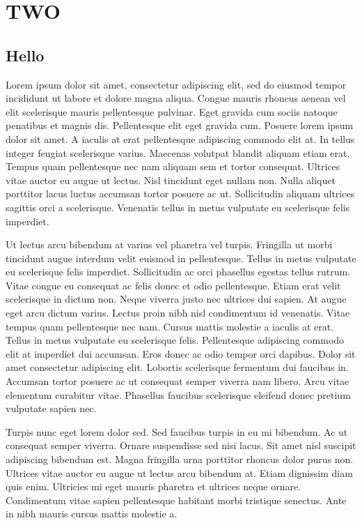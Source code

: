 \documentclass[../main.tex]{subfile}
\begin{document}
\chapter{TWO}
\section{Hello}
Lorem ipsum dolor sit amet, consectetur adipiscing elit, sed do eiusmod tempor incididunt ut labore et dolore magna aliqua. Congue mauris rhoncus aenean vel elit scelerisque mauris pellentesque pulvinar. Eget gravida cum sociis natoque penatibus et magnis dis. Pellentesque elit eget gravida cum. Posuere lorem ipsum dolor sit amet. A iaculis at erat pellentesque adipiscing commodo elit at. In tellus integer feugiat scelerisque varius. Maecenas volutpat blandit aliquam etiam erat. Tempus quam pellentesque nec nam aliquam sem et tortor consequat. Ultrices vitae auctor eu augue ut lectus. Nisl tincidunt eget nullam non. Nulla aliquet porttitor lacus luctus accumsan tortor posuere ac ut. Sollicitudin aliquam ultrices sagittis orci a scelerisque. Venenatis tellus in metus vulputate eu scelerisque felis imperdiet.

Ut lectus arcu bibendum at varius vel pharetra vel turpis. Fringilla ut morbi tincidunt augue interdum velit euismod in pellentesque. Tellus in metus vulputate eu scelerisque felis imperdiet. Sollicitudin ac orci phasellus egestas tellus rutrum. Vitae congue eu consequat ac felis donec et odio pellentesque. Etiam erat velit scelerisque in dictum non. Neque viverra justo nec ultrices dui sapien. At augue eget arcu dictum varius. Lectus proin nibh nisl condimentum id venenatis. Vitae tempus quam pellentesque nec nam. Cursus mattis molestie a iaculis at erat. Tellus in metus vulputate eu scelerisque felis. Pellentesque adipiscing commodo elit at imperdiet dui accumsan. Eros donec ac odio tempor orci dapibus. Dolor sit amet consectetur adipiscing elit. Lobortis scelerisque fermentum dui faucibus in. Accumsan tortor posuere ac ut consequat semper viverra nam libero. Arcu vitae elementum curabitur vitae. Phasellus faucibus scelerisque eleifend donec pretium vulputate sapien nec.

Turpis nunc eget lorem dolor sed. Sed faucibus turpis in eu mi bibendum. Ac ut consequat semper viverra. Ornare suspendisse sed nisi lacus. Sit amet nisl suscipit adipiscing bibendum est. Magna fringilla urna porttitor rhoncus dolor purus non. Ultrices vitae auctor eu augue ut lectus arcu bibendum at. Etiam dignissim diam quis enim. Ultricies mi eget mauris pharetra et ultrices neque ornare. Condimentum vitae sapien pellentesque habitant morbi tristique senectus. Ante in nibh mauris cursus mattis molestie a.
\end{document}
